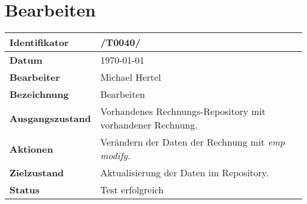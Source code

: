 
\section{Bearbeiten}

\renewcommand{\arraystretch}{1.5}

\begin{center}
 \begin{tabular}{|p{}|p{}|}
	\hline
	\textbf{Identifikator}  & /T0040/ \\
	\hline
	\textbf{Datum} & \today \\
	\hline
	\textbf{Bearbeiter} & Michael Hertel \\
	\hline
	\textbf{Bezeichnung} & Bearbeiten \\
	\hline
	\textbf{Ausgangszustand} &
		Vorhandenes Rechnungs-Repository mit vorhandener Rechnung. \\
	\hline
	\textbf{Aktionen} &
		Verändern der Daten der Rechnung mit \textit{emp modify}. \\
	\hline
	\textbf{Zielzustand} &
		Aktualisierung der Daten im Repository. \\
	\hline
	\textbf{Status} & Test erfolgreich \\
	\hline
 \end{tabular}
\end{center}
